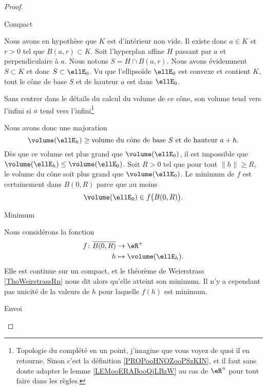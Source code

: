 \begin{proof}
\begin{subproof}
		\item[Compact]

		Nous avons en hypothèse que \( K\) est d'intérieur non vide. Il existe donc \( a\in K\) et \( r>0\) tel que \( B(a,r)\subset K\). Soit l'hyperplan affine \( H\) passant par \( a\) et perpendiculaire à \( a\). Nous notons \( S=H\cap B(a,r)\). Nous avons évidemment \( S\subset K\) et donc \( S\subset \ellE_0\). Vu que l'ellipsoïde \( \ellE_0\) est convexe et contient \( K\), tout le cône de base \( S\) et de hauteur \( a\) est dans \( \ellE_0\).

		Sans rentrer dans le détails du calcul du volume de ce cône, son volume tend vers l'infini si \( a\) tend vers l'infini\footnote{Topologie du complété en un point, j'imagine que vous voyez de quoi il en retourne. Sinon c'est la définition \ref{PROPooHNOZooPSzKIN}, et il faut sans doute adapter le lemme \ref{LEMooERABooQjLBzW} au cas de \( \eR^n\) pour tout faire dans les règles.}

		Nous avons donc une majoration
		\begin{equation}
			\volume(\ellE_h)\geq \text{volume du cône de base } S\text{ et de hauteur } a+h.
		\end{equation}
		Dès que ce volume est plus grand que \( \volume(\ellE_0)\), il est impossible que \( \volume(\ellE_h)\leq \volume(\ellE_0)\). Soit \( R>0\) tel que pour tout \( \| h \|\geq R\), le volume du cône soit plus grand que \( \volume(\ellE_0)\). Le minimum de \( f\) est certainement dans \( B(0,R)\) parce que au moins
		\begin{equation}
			\volume(\ellE_0)\in f\big( B(0,R) \big).
		\end{equation}

		\item[Minimum]

		Nous considérons la fonction
		\begin{equation}
			\begin{aligned}
				f\colon \overline{ B(0,R) } & \to \eR^+                 \\
				h                           & \mapsto \volume(\ellE_h).
			\end{aligned}
		\end{equation}
		Elle est continue sur un compact, et le théorème de Weierstrass \ref{ThoWeirstrassRn} nous dit alors qu'elle atteint son minimum. Il n'y a cependant pas unicité de la valeurs de \( h\) pour laquelle \( f(h)\) est minimum.

		\item[Envoi]


\end{subproof}
\end{proof}
